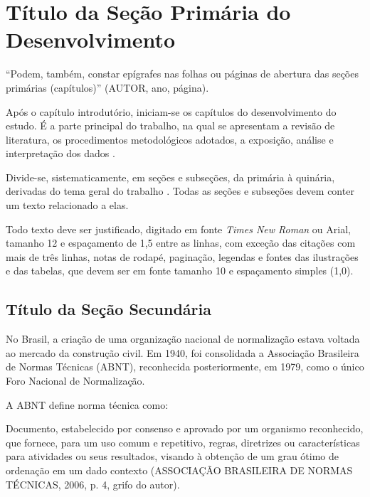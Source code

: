 \chapter{Título da Seção Primária do Desenvolvimento}

\begin{SingleSpace}
\begin{flushright}
\begin{minipage}[b]{8cm}
\begin{small}
``Podem, também, constar epígrafes nas folhas ou páginas de abertura das seções primárias (capítulos)'' (AUTOR, ano, página).
\end{small}
\end{minipage}
\end{flushright}
\end{SingleSpace}

Após o capítulo introdutório, iniciam-se os capítulos do desenvolvimento do estudo. É a parte principal do trabalho, na qual se apresentam a revisão de literatura, os procedimentos metodológicos adotados, a exposição, análise e interpretação dos dados \cite{koche,marconi}.

Divide-se, sistematicamente, em seções e subseções, da primária à quinária, derivadas do tema geral do trabalho \cite{barros}. Todas as seções e subseções devem conter um texto relacionado a elas.

Todo texto deve ser justificado, digitado em fonte \textit{Times New Roman} ou Arial, tamanho 12 e espaçamento de 1,5 entre as linhas, com exceção das citações com mais de três linhas, notas de rodapé, paginação, legendas e fontes das ilustrações e das tabelas, que devem ser em fonte tamanho 10 e espaçamento simples (1,0).

\section{Título da Seção Secundária}

No Brasil, a criação de uma organização nacional de normalização estava voltada ao mercado da construção civil. Em 1940, foi consolidada a Associação Brasileira de Normas Técnicas (ABNT), reconhecida posteriormente, em 1979, como o único Foro Nacional de Normalização.

A ABNT define norma técnica como:

\begin{SingleSpace}
\begin{flushright}
\begin{minipage}[b]{12cm}
\begin{small}
Documento, estabelecido por consenso e aprovado por um organismo reconhecido, que fornece, para um uso comum e repetitivo, regras, diretrizes ou características para atividades ou seus resultados, visando à obtenção de um grau ótimo de ordenação em um dado contexto (ASSOCIAÇÃO BRASILEIRA DE NORMAS TÉCNICAS, 2006, p. 4, grifo do autor).
\end{small}
\end{minipage}
\end{flushright}
\end{SingleSpace}

